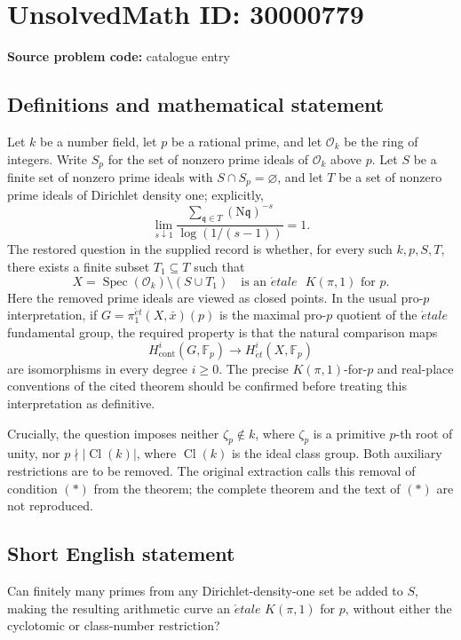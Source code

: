 \documentclass[11pt]{article}
\newcommand{\F}{\mathbb{F}}
\begin{document}
\section*{UnsolvedMath ID: 30000779}
\textbf{Source problem code:} catalogue entry
\subsection{Definitions and mathematical statement}
Let \(k\) be a number field, let \(p\) be a rational prime, and let \(\mathcal O_k\) be the ring of integers. Write \(S_p\) for the set of nonzero prime ideals of \(\mathcal O_k\) above \(p\). Let \(S\) be a finite set of nonzero prime ideals with \(S\cap S_p=\varnothing\), and let \(T\) be a set of nonzero prime ideals of Dirichlet density one; explicitly,
\[
\lim_{s\downarrow1}\frac{\sum_{\mathfrak q\in T}(\mathrm N\mathfrak q)^{-s}}{\log(1/(s-1))}=1.
\]
The restored question in the supplied record is whether, for every such \(k,p,S,T\), there exists a finite subset \(T_1\subseteq T\) such that
\[
X=\operatorname{Spec}(\mathcal O_k)\setminus(S\cup T_1)
\quad\text{is an \(\acute{e}tale\) \(K(\pi,1)\) for \(p\)}.
\]
Here the removed prime ideals are viewed as closed points. In the usual pro-\(p\) interpretation, if \(G=\pi_1^{\acute{e}t}(X,\bar x)(p)\) is the maximal pro-\(p\) quotient of the \(\acute{e}tale\) fundamental group, the required property is that the natural comparison maps
\[
H^i_{\mathrm{cont}}(G,\F_p)\longrightarrow H^i_{\acute{e}t}(X,\F_p)
\]
are isomorphisms in every degree \(i\geq0\). The precise \(K(\pi,1)\)-for-\(p\) and real-place conventions of the cited theorem should be confirmed before treating this interpretation as definitive.

Crucially, the question imposes neither \(\zeta_p\notin k\), where \(\zeta_p\) is a primitive \(p\)-th root of unity, nor \(p\nmid|\operatorname{Cl}(k)|\), where \(\operatorname{Cl}(k)\) is the ideal class group. Both auxiliary restrictions are to be removed. The original extraction calls this removal of condition \((*)\) from the theorem; the complete theorem and the text of \((*)\) are not reproduced.
\subsection{Short English statement}
Can finitely many primes from any Dirichlet-density-one set be added to \(S\), making the resulting arithmetic curve an \(\acute{e}tale\) \(K(\pi,1)\) for \(p\), without either the cyclotomic or class-number restriction?
\end{document}
